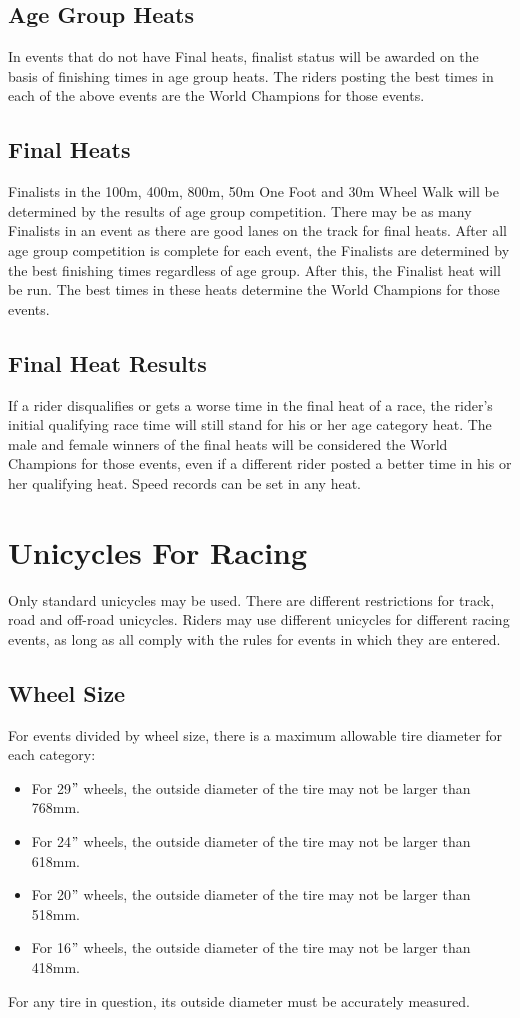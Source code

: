 \subsection{Age Group Heats}
In events that do not have Final heats, finalist status will be awarded on the basis of finishing times in age group heats.
The riders posting the best times in each of the above events are the World Champions for those events.

\subsection{Final Heats}
Finalists in the 100m, 400m, 800m, 50m One Foot and 30m Wheel Walk will be determined by the results of age group competition.
There may be as many Finalists in an event as there are good lanes on the track for final heats.
After all age group competition is complete for each event, the Finalists are determined by the best finishing times regardless of age group.
After this, the Finalist heat will be run.
The best times in these heats determine the World Champions for those events.

\subsection{Final Heat Results}
If a rider disqualifies or gets a worse time in the final heat of a race, the rider’s initial qualifying race time will still stand for his or her age category heat.
The male and female winners of the final heats will be considered the World Champions for those events, even if a different rider posted a better time in his or her qualifying heat.
Speed records can be set in any heat.

\section{Unicycles For Racing}
Only standard unicycles may be used.
There are different restrictions for track, road and off-road unicycles.
Riders may use different unicycles for different racing events, as long as all comply with the rules for events in which they are entered.

\subsection{Wheel Size}
For events divided by wheel size, there is a maximum allowable tire diameter for each category: 
\begin{itemize}
\item For 29$"$ wheels, the outside diameter of the tire may not be larger than 768mm.
\item For 24$"$ wheels, the outside diameter of the tire may not be larger than 618mm.
\item For 20$"$ wheels, the outside diameter of the tire may not be larger than 518mm.
\item For 16$"$ wheels, the outside diameter of the tire may not be larger than 418mm.
\end{itemize}
For any tire in question, its outside diameter must be accurately measured.

